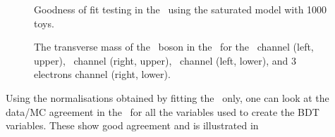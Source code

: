 \begin{figure}[htbp]
	\centering
	\caption{Goodness of fit testing in the \WZCR\ using the saturated model with 1000 toys.}
	\label{fig:gof}
\end{figure}

\begin{figure}[htbp]
	\centering
	\caption{The transverse mass of the \PW\ boson in the \WZCR\ for the \mumumu\ channel (left, upper), \emumu\ channel (right, upper), \eemu\ channel (left, lower), and 3 electrons channel (right, lower).}
	\label{fig:mtwstack}
\end{figure}

Using the normalisations obtained by fitting the \WZCR\ only,  one can look at the data/MC  agreement in the \WZCR\ for all the variables used to create the BDT variables. These show good agreement and is illustrated in 

